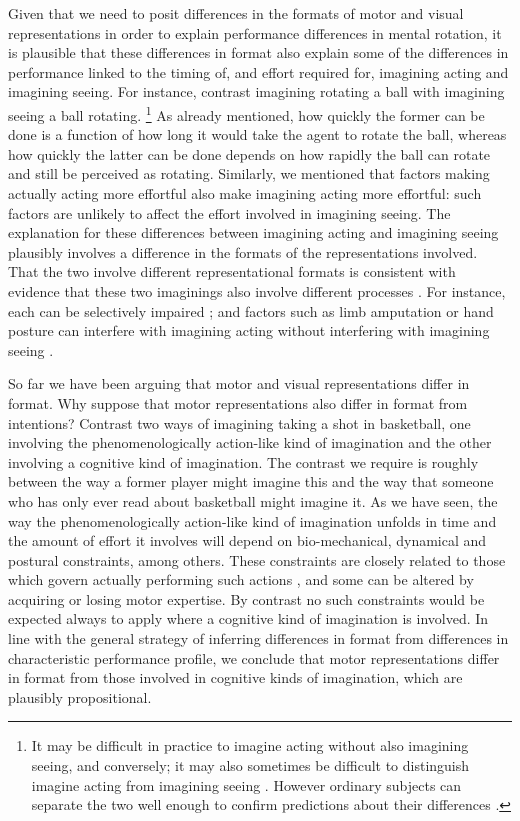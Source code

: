 \documentclass[12pt,\papersize]{extarticle}
\begin{document}
Given that we need to posit differences in the formats of motor and visual representations in order to explain performance differences in mental rotation, it is plausible that these differences in format also explain some of the differences in performance linked to the timing of, and effort required for, imagining acting and imagining seeing.  For instance, contrast imagining rotating a ball with imagining seeing a ball rotating.%
\footnote{It may be difficult in practice to imagine acting without also imagining seeing, and conversely; it may also sometimes be difficult to distinguish imagine acting from imagining seeing \citep[as][p.\ 170 note]{currie:1997_mental}. However ordinary subjects can separate the two well enough to confirm predictions about their differences \citep[see, e.g.,][]{kosslyn:2001_imagining}.
}
As already mentioned, how quickly the former can be done is a function of how long it would take the agent to rotate the ball, whereas how quickly the latter can be done depends on how rapidly the ball can rotate and still be perceived as rotating. Similarly, we mentioned that factors making actually acting more effortful also make imagining acting more effortful: such factors are unlikely to affect the effort involved in imagining seeing. The explanation for these differences between imagining acting and imagining seeing plausibly involves a difference in the formats of the representations involved. That the two involve different representational formats is consistent with evidence that these two imaginings also involve different processes \citep{kosslyn:2001_imagining}. For instance, each can be selectively impaired \citep{sirigu:2011_motor}; and factors such as limb amputation or hand posture can interfere with imagining acting without interfering with  imagining seeing \citep{nico:2004_left, vargas:2004s_influence,  fourkas:2006_influence}.

So far we have been arguing that motor and visual representations differ in format.  Why suppose that motor representations also differ in format from intentions?  Contrast two ways of imagining taking a shot in basketball, one involving the phenomenologically action-like kind of imagination and the other involving a cognitive kind of imagination.  The contrast we require is roughly between the way a former player might imagine this and the way that someone who has only ever read about basketball might imagine it.  As we have seen, the way the phenomenologically action-like kind of imagination unfolds in time and the amount of effort it involves will depend on bio-mechanical, dynamical and postural constraints, among others. These constraints are closely related to those which govern actually performing such actions \citep{Jeannerod:2001yb}, and some can be altered by acquiring or losing motor expertise.  By contrast no such constraints would be expected always to apply where a cognitive kind of imagination is involved.  In line with the general strategy of inferring differences in format from differences in characteristic performance profile, we conclude that motor representations differ in format from those involved in cognitive kinds of imagination, which are plausibly propositional.
\end{document}
